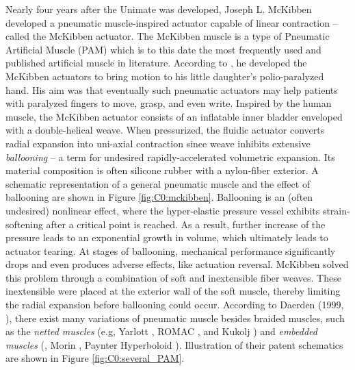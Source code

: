 Nearly four years after the Unimate was developed, Joseph L. McKibben developed a pneumatic muscle-inspired actuator capable of linear contraction -- called the McKibben actuator. The McKibben muscle is a type of Pneumatic Artificial Muscle (PAM) which is to this date the most frequently used and published artificial muscle in literature. According to \cite{Mckibben}, he developed the McKibben actuators to bring motion to his little daughter's polio-paralyzed hand. His aim was that eventually such pneumatic actuators may help patients with paralyzed fingers to move, grasp, and even write. Inspired by the human muscle, the McKibben actuator consists of an inflatable inner bladder enveloped with a double-helical weave. When pressurized, the fluidic actuator converts radial expansion into uni-axial contraction \cite{Daerden1999,Daerden2000,Schulte1961} since weave inhibits extensive \emph{ballooning} -- a term for undesired rapidly-accelerated volumetric expansion. Its material composition is often silicone rubber with a nylon-fiber exterior. A schematic representation of a general pneumatic muscle and the effect of ballooning are shown in Figure \ref{fig:C0:mckibben}. Ballooning is an (often undesired) nonlinear effect, where the hyper-elastic pressure vessel exhibits strain-softening after a critical point is reached. As a result, further increase of the pressure leads to an exponential growth in volume, which ultimately leads to actuator tearing. At stages of ballooning, mechanical performance significantly drops and even produces adverse effects, like actuation reversal. McKibben solved this problem through a combination of soft and inextensible fiber weaves. These inextensible were placed at the exterior wall of the soft muscle, thereby limiting the radial expansion before ballooning could occur. According to Daerden (1999, \cite{Daerden1999}), there exist many variations of pneumatic muscle besides braided muscles, such as the \emph{netted muscles} (e.g, Yarlott \cite{Yarlott1972}, ROMAC \cite{Immega1986}, and Kukolj \cite{Kukolj1988}) and \emph{embedded muscles} (\eg, Morin \cite{Morin1953}, Paynter Hyperboloid \cite{Paynter1988}). Illustration of their patent schematics are shown in Figure \ref{fig:C0:several_PAM}.

